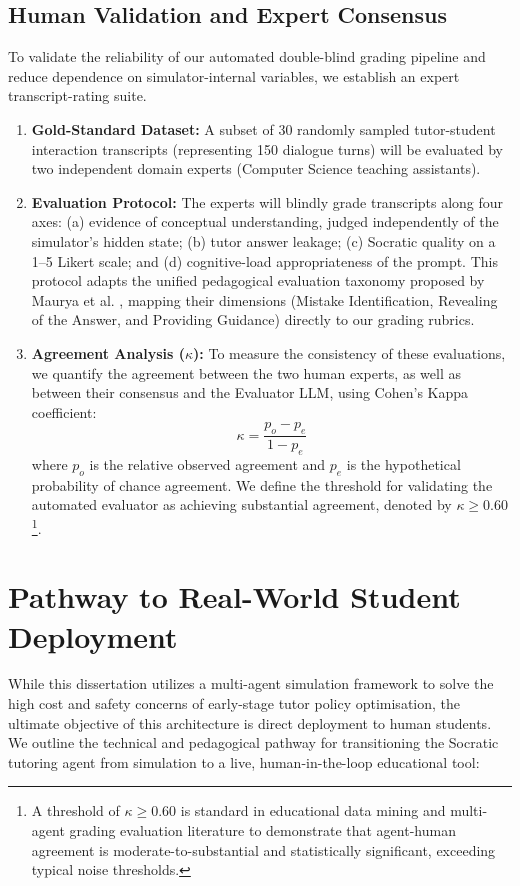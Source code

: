 \documentclass[11pt,a4paper]{report}
\begin{document}
\subsection{Human Validation and Expert Consensus}
To validate the reliability of our automated double-blind grading pipeline and reduce dependence on simulator-internal variables, we establish an expert transcript-rating suite.
\begin{enumerate}
    \item \textbf{Gold-Standard Dataset:} A subset of 30 randomly sampled tutor-student interaction transcripts (representing 150 dialogue turns) will be evaluated by two independent domain experts (Computer Science teaching assistants).
    \item \textbf{Evaluation Protocol:} The experts will blindly grade transcripts along four axes: (a) evidence of conceptual understanding, judged independently of the simulator's hidden state; (b) tutor answer leakage; (c) Socratic quality on a 1--5 Likert scale; and (d) cognitive-load appropriateness of the prompt. This protocol adapts the unified pedagogical evaluation taxonomy proposed by Maurya et al. \cite{maurya2025unifying}, mapping their dimensions (Mistake Identification, Revealing of the Answer, and Providing Guidance) directly to our grading rubrics.
    \item \textbf{Agreement Analysis ($\kappa$):} To measure the consistency of these evaluations, we quantify the agreement between the two human experts, as well as between their consensus and the Evaluator LLM, using Cohen's Kappa coefficient:
    \begin{equation}
        \kappa = \frac{p_o - p_e}{1 - p_e}
    \end{equation}
    where $p_o$ is the relative observed agreement and $p_e$ is the hypothetical probability of chance agreement. We define the threshold for validating the automated evaluator as achieving substantial agreement, denoted by $\kappa \ge 0.60$\footnote{A threshold of $\kappa \ge 0.60$ is standard in educational data mining and multi-agent grading evaluation literature to demonstrate that agent-human agreement is moderate-to-substantial and statistically significant, exceeding typical noise thresholds.}.

\end{enumerate}

\section{Pathway to Real-World Student Deployment}
While this dissertation utilizes a multi-agent simulation framework to solve the high cost and safety concerns of early-stage tutor policy optimisation, the ultimate objective of this architecture is direct deployment to human students. We outline the technical and pedagogical pathway for transitioning the Socratic tutoring agent from simulation to a live, human-in-the-loop educational tool:
\end{document}
